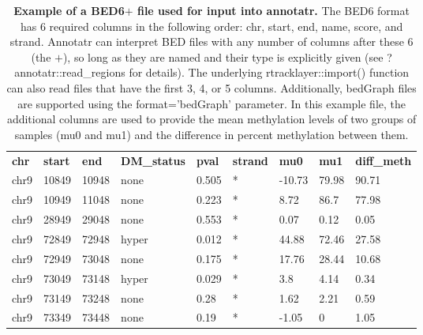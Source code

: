 \begin{table}[!ht]
\small
\centering
\begin{tabular}{lllllllll}
\textbf{chr} & \textbf{start} & \textbf{end} & \textbf{DM\_status} & \textbf{pval} & \textbf{strand} & \textbf{mu0} & \textbf{mu1} & \textbf{diff\_meth} \\
chr9         & 10849          & 10948        & none                & 0.505         & *               & -10.73       & 79.98        & 90.71               \\
chr9         & 10949          & 11048        & none                & 0.223         & *               & 8.72         & 86.7         & 77.98               \\
chr9         & 28949          & 29048        & none                & 0.553         & *               & 0.07         & 0.12         & 0.05                \\
chr9         & 72849          & 72948        & hyper               & 0.012         & *               & 44.88        & 72.46        & 27.58               \\
chr9         & 72949          & 73048        & none                & 0.175         & *               & 17.76        & 28.44        & 10.68               \\
chr9         & 73049          & 73148        & hyper               & 0.029         & *               & 3.8          & 4.14         & 0.34                \\
chr9         & 73149          & 73248        & none                & 0.28          & *               & 1.62         & 2.21         & 0.59                \\
chr9         & 73349          & 73448        & none                & 0.19          & *               & -1.05        & 0            & 1.05
\end{tabular}
\normalsize
\caption[Example of a BED6$+$ file used for input into annotatr.]
{
\textbf{Example of a BED6$+$ file used for input into annotatr.}
The BED6 format has 6 required columns in the following order: chr, start, end, name, score, and strand. Annotatr can interpret BED files with any number of columns after these 6 (the $+$), so long as they are named and their type is explicitly given (see ?annotatr::read\_regions for details). The underlying rtracklayer::import() function can also read files that have the first 3, 4, or 5 columns. Additionally, bedGraph files are supported using the format='bedGraph' parameter. In this example file, the additional columns are used to provide the mean methylation levels of two groups of samples (mu0 and mu1) and the difference in percent methylation between them.
}
\label{chap4:table:2}

\end{table}

